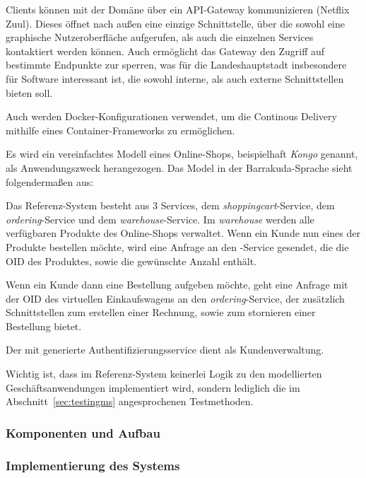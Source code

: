 \documentclass[12pt,a4paper,bibliography=totocnumbered,listof=totocnumbered]{scrartcl}
\begin{document}
Clients können mit der Domäne über ein \ac{API}-Gateway kommunizieren (Netflix Zuul). Dieses öffnet nach außen eine einzige Schnittstelle, über die sowohl eine graphische Nutzeroberfläche aufgerufen, als auch die einzelnen Services kontaktiert werden können. Auch ermöglicht das Gateway den Zugriff auf bestimmte Endpunkte zur sperren, was für die Landeshauptstadt insbesondere für Software interessant ist, die sowohl interne, als auch externe Schnittstellen bieten soll.

Auch werden Docker-Konfigurationen verwendet, um die Continous Delivery mithilfe eines Container-Frameworks zu ermöglichen.

Es wird ein vereinfachtes Modell eines Online-Shops, beispielhaft \textit{Kongo} genannt, als Anwendungszweck herangezogen. Das Model in der Barrakuda-Sprache sieht folgendermaßen aus:



Das Referenz-System besteht aus 3 Services, dem \textit{shoppingcart}-Service, dem \textit{ordering}-Service und dem \textit{warehouse}-Service. Im \textit{warehouse} werden alle verfügbaren Produkte des Online-Shops verwaltet. Wenn ein Kunde nun eines der Produkte bestellen möchte, wird eine Anfrage an den -Service gesendet, die die OID des Produktes, sowie die gewünschte Anzahl enthält.

Wenn ein Kunde dann eine Bestellung aufgeben möchte, geht eine Anfrage mit der OID des virtuellen Einkaufswagens an den \textit{ordering}-Service, der zusätzlich Schnittstellen zum erstellen einer Rechnung, sowie zum stornieren einer Bestellung bietet.

Der mit generierte Authentifizierungsservice dient als Kundenverwaltung.


Wichtig ist, dass im Referenz-System keinerlei Logik zu den modellierten Geschäftsanwendungen implementiert wird, sondern lediglich die im Abschnitt~\ref{sec:testingms} angesprochenen Testmethoden.

\subsubsection{Komponenten und Aufbau}

\subsubsection{Implementierung des Systems}
\end{document}
